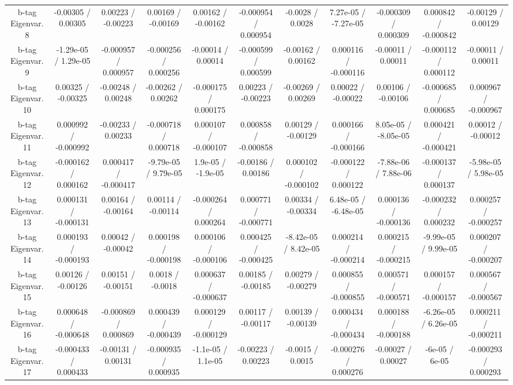 {\begin{landscape}
\begin{longtable}{@{\extracolsep{\fill}}| *{11}{c|}}
  b-tag Eigenvar. 8 & -0.00305 / 0.00305 & 0.00223 / -0.00223 & 0.00169 / -0.00169 & 0.00162 / -0.00162 & -0.000954 / 0.000954 & -0.0028 / 0.0028 & 7.27e-05 / -7.27e-05 & -0.000309 / 0.000309 & 0.000842 / -0.000842 & -0.00129 / 0.00129 \\ 
  b-tag Eigenvar. 9 & -1.29e-05 / 1.29e-05 & -0.000957 / 0.000957 & -0.000256 / 0.000256 & -0.00014 / 0.00014 & -0.000599 / 0.000599 & -0.00162 / 0.00162 & 0.000116 / -0.000116 & -0.00011 / 0.00011 & -0.000112 / 0.000112 & -0.00011 / 0.00011 \\ 
  b-tag Eigenvar. 10 & 0.00325 / -0.00325 & -0.00248 / 0.00248 & -0.00262 / 0.00262 & -0.000175 / 0.000175 & 0.00223 / -0.00223 & -0.00269 / 0.00269 & 0.00022 / -0.00022 & 0.00106 / -0.00106 & -0.000685 / 0.000685 & 0.000967 / -0.000967 \\ 
  b-tag Eigenvar. 11 & 0.000992 / -0.000992 & -0.00233 / 0.00233 & -0.000718 / 0.000718 & 0.000107 / -0.000107 & 0.000858 / -0.000858 & 0.00129 / -0.00129 & 0.000166 / -0.000166 & 8.05e-05 / -8.05e-05 & 0.000421 / -0.000421 & 0.00012 / -0.00012 \\ 
  b-tag Eigenvar. 12 & -0.000162 / 0.000162 & 0.000417 / -0.000417 & -9.79e-05 / 9.79e-05 & 1.9e-05 / -1.9e-05 & -0.00186 / 0.00186 & 0.000102 / -0.000102 & -0.000122 / 0.000122 & -7.88e-06 / 7.88e-06 & -0.000137 / 0.000137 & -5.98e-05 / 5.98e-05 \\ 
  b-tag Eigenvar. 13 & 0.000131 / -0.000131 & 0.00164 / -0.00164 & 0.00114 / -0.00114 & -0.000264 / 0.000264 & 0.000771 / -0.000771 & 0.00334 / -0.00334 & 6.48e-05 / -6.48e-05 & 0.000136 / -0.000136 & -0.000232 / 0.000232 & 0.000257 / -0.000257 \\ 
  b-tag Eigenvar. 14 & 0.000193 / -0.000193 & 0.00042 / -0.00042 & 0.000198 / -0.000198 & 0.000106 / -0.000106 & 0.000425 / -0.000425 & -8.42e-05 / 8.42e-05 & 0.000214 / -0.000214 & 0.000215 / -0.000215 & -9.99e-05 / 9.99e-05 & 0.000207 / -0.000207 \\ 
  b-tag Eigenvar. 15 & 0.00126 / -0.00126 & 0.00151 / -0.00151 & 0.0018 / -0.0018 & 0.000637 / -0.000637 & 0.00185 / -0.00185 & 0.00279 / -0.00279 & 0.000855 / -0.000855 & 0.000571 / -0.000571 & 0.000157 / -0.000157 & 0.000567 / -0.000567 \\ 
  b-tag Eigenvar. 16 & 0.000648 / -0.000648 & -0.000869 / 0.000869 & 0.000439 / -0.000439 & 0.000129 / -0.000129 & 0.00117 / -0.00117 & 0.00139 / -0.00139 & 0.000434 / -0.000434 & 0.000188 / -0.000188 & -6.26e-05 / 6.26e-05 & 0.000211 / -0.000211 \\ 
  b-tag Eigenvar. 17 & -0.000433 / 0.000433 & -0.00131 / 0.00131 & -0.000935 / 0.000935 & -1.1e-05 / 1.1e-05 & -0.00223 / 0.00223 & -0.0015 / 0.0015 & -0.000276 / 0.000276 & -0.00027 / 0.00027 & -6e-05 / 6e-05 & -0.000293 / 0.000293 \\ 

\end{longtable}
\end{landscape}}
